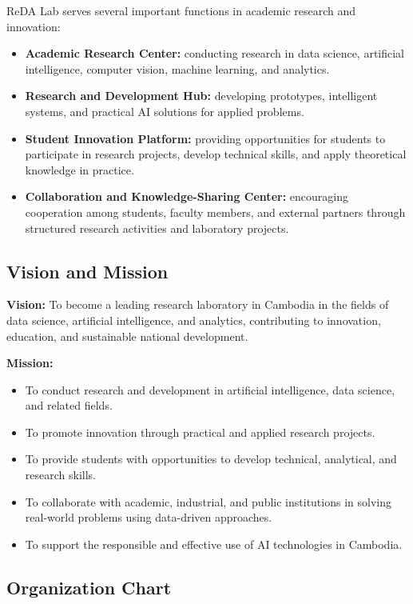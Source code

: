 ReDA Lab serves several important functions in academic research and innovation:

\begin{itemize}
    \item \textbf{Academic Research Center:} conducting research in data science, artificial intelligence, computer vision, machine learning, and analytics.
    \item \textbf{Research and Development Hub:} developing prototypes, intelligent systems, and practical AI solutions for applied problems.
    \item \textbf{Student Innovation Platform:} providing opportunities for students to participate in research projects, develop technical skills, and apply theoretical knowledge in practice.
    \item \textbf{Collaboration and Knowledge-Sharing Center:} encouraging cooperation among students, faculty members, and external partners through structured research activities and laboratory projects.
\end{itemize}

\subsection{Vision and Mission}

\textbf{Vision:} To become a leading research laboratory in Cambodia in the fields of data science, artificial intelligence, and analytics, contributing to innovation, education, and sustainable national development.

\textbf{Mission:}
\begin{itemize}
    \item To conduct research and development in artificial intelligence, data science, and related fields.
    \item To promote innovation through practical and applied research projects.
    \item To provide students with opportunities to develop technical, analytical, and research skills.
    \item To collaborate with academic, industrial, and public institutions in solving real-world problems using data-driven approaches.
    \item To support the responsible and effective use of AI technologies in Cambodia.
\end{itemize}

\subsection{Organization Chart}

